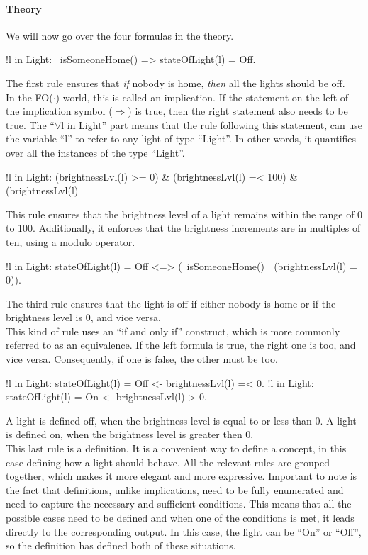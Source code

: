 \documentclass[11pt,a4paper]{report}
\newcommand{\fodot}{FO($\cdot$)\xspace}
\begin{document}
\paragraph{Theory}
We will now go over the four formulas in the theory.
\begin{idplisting}
!l in Light: ~isSomeoneHome() => stateOfLight(l) = Off.
\end{idplisting}
The first rule ensures that \textit{if} nobody is home, \textit{then} all the lights should be off.\\
In the \fodot world, this is called an implication. If the statement on the left of the implication symbol ($\Rightarrow$) is true, then the right statement also needs to be true. The ``$\forall$l in Light'' part means that the rule following this statement, can use the variable ``l'' to refer to any light of type ``Light''. In other words, it quantifies over all the instances of the type ``Light''.
\begin{idplisting}
!l in Light: (brightnessLvl(l) >= 0) &
(brightnessLvl(l) =< 100) & (brightnessLvl(l) %
\end{idplisting}
This rule ensures that the brightness level of a light remains within the range of 0 to 100. Additionally, it enforces that the brightness increments are in multiples of ten, using a modulo operator.
\begin{idplisting}
!l in Light: stateOfLight(l) = Off <=> 
(~isSomeoneHome() | (brightnessLvl(l) = 0)).
\end{idplisting}
The third rule ensures that the light is off if either nobody is home or if the brightness level is 0, and vice versa.\\
This kind of rule uses an ``if and only if'' construct, which is more commonly referred to as an equivalence. If the left formula is true, the right one is too, and vice versa. Consequently, if one is false, the other must be too.

\begin{idplisting}
{
   !l in Light: stateOfLight(l) = Off <- brightnessLvl(l) =< 0.
   !l in Light: stateOfLight(l) = On <- brightnessLvl(l) > 0.
}
\end{idplisting}
A light is defined off, when the brightness level is equal to or less than 0. A light is defined on, when the brightness level is greater then 0.\\
This last rule is a definition. It is a convenient way to define a concept, in this case defining how a light should behave. All the relevant rules are grouped together, which makes it more elegant and more expressive. Important to note is the fact that definitions, unlike implications, need to be fully enumerated and need to capture the necessary and sufficient conditions. This means that all the possible cases need to be defined and when one of the conditions is met, it leads directly to the corresponding output.
In this case, the light can be ``On'' or ``Off'', so the definition has defined both of these situations.
\end{document}
